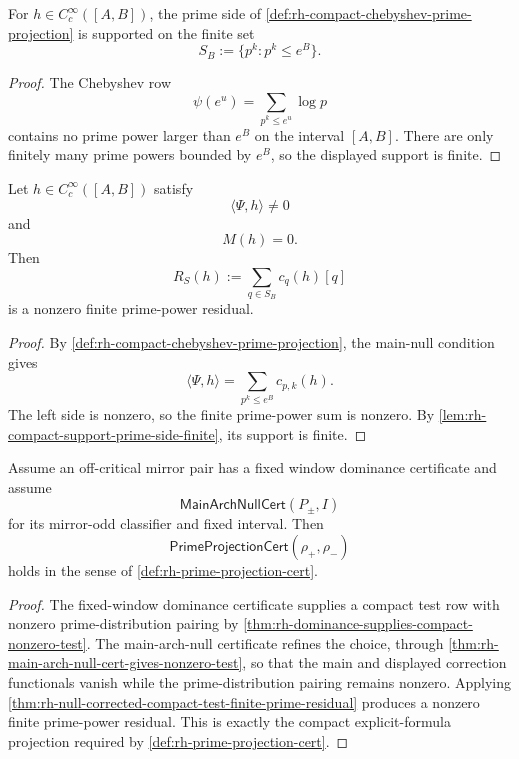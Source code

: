 \begin{lemma}
\label{lem:rh-compact-support-prime-side-finite}
For $h\in C_c^\infty([A,B])$, the prime side of
\autoref{def:rh-compact-chebyshev-prime-projection} is supported on
the finite set
$$
S_B:=\{p^k:p^k\le e^B\}.
$$
\end{lemma}

\begin{proof}
The Chebyshev row
$$
\psi(e^u)=\sum_{p^k\le e^u}\log p
$$
contains no prime power larger than $e^B$ on the interval $[A,B]$.
There are only finitely many prime powers bounded by $e^B$, so the
displayed support is finite.
\end{proof}

\begin{theorem}
\label{thm:rh-null-corrected-compact-test-finite-prime-residual}
Let $h\in C_c^\infty([A,B])$ satisfy
$$
\langle\Psi,h\rangle\ne0
$$
and
$$
M(h)=0.
$$
Then
$$
R_S(h):=\sum_{q\in S_B}c_q(h)[q]
$$
is a nonzero finite prime-power residual.
\end{theorem}

\begin{proof}
By
\autoref{def:rh-compact-chebyshev-prime-projection}, the main-null
condition gives
$$
\langle\Psi,h\rangle
=
\sum_{p^k\le e^B}c_{p,k}(h).
$$
The left side is nonzero, so the finite prime-power sum is nonzero.
By
\autoref{lem:rh-compact-support-prime-side-finite}, its support is
finite.
\end{proof}

\begin{theorem}
\label{thm:rh-main-arch-null-cert-realizes-prime-projection-cert}
Assume an off-critical mirror pair has a fixed window dominance
certificate and assume
$$
\mathsf{MainArchNullCert}(P_\pm,I)
$$
for its mirror-odd classifier and fixed interval.  Then
$$
\mathsf{PrimeProjectionCert}(\rho_+,\rho_-)
$$
holds in the sense of \autoref{def:rh-prime-projection-cert}.
\end{theorem}

\begin{proof}
The fixed-window dominance certificate supplies a compact test row with
nonzero prime-distribution pairing by
\autoref{thm:rh-dominance-supplies-compact-nonzero-test}.  The
main-arch-null certificate refines the choice, through
\autoref{thm:rh-main-arch-null-cert-gives-nonzero-test}, so that the
main and displayed correction functionals vanish while the
prime-distribution pairing remains nonzero.  Applying
\autoref{thm:rh-null-corrected-compact-test-finite-prime-residual}
produces a nonzero finite prime-power residual.  This is exactly the
compact explicit-formula projection required by
\autoref{def:rh-prime-projection-cert}.
\end{proof}

